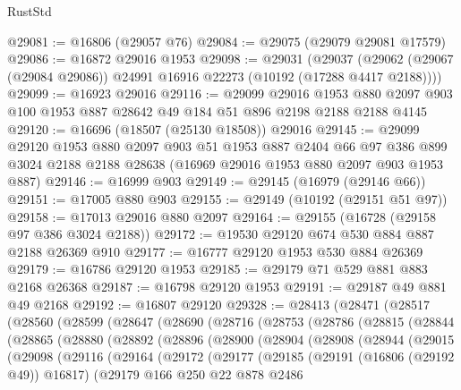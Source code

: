 \begin{lexlean}{RustStd}
\begin{coremodule}
@29081 := @16806 (@29057 @76)
@29084 := @29075 (@29079 @29081 @17579)
@29086 := @16872 @29016 @1953
@29098 := @29031
    (@29037 (@29062 (@29067 (@29084 @29086)) @24991 @16916 @22273 (@10192 (@17288 @4417 @2188))))
@29099 := @16923 @29016
@29116 := @29099
    @29016
    @1953
    @880
    @2097
    @903
    @100
    @1953
    @887
    @28642
    @49
    @184
    @51
    @896
    @2198
    @2188
    @2188
    @4145
@29120 := @16696 (@18507 (@25130 @18508)) @29016
@29145 := @29099
    @29120
    @1953
    @880
    @2097
    @903
    @51
    @1953
    @887
    @2404
    @66
    @97
    @386
    @899
    @3024
    @2188
    @2188
    @28638
    (@16969 @29016 @1953 @880 @2097 @903 @1953 @887)
@29146 := @16999 @903
@29149 := @29145 (@16979 (@29146 @66))
@29151 := @17005 @880 @903
@29155 := @29149 (@10192 (@29151 @51 @97))
@29158 := @17013 @29016 @880 @2097
@29164 := @29155 (@16728 (@29158 @97 @386 @3024 @2188))
@29172 := @19530 @29120 @674 @530 @884 @887 @2188 @26369 @910
@29177 := @16777 @29120 @1953 @530 @884 @26369
@29179 := @16786 @29120 @1953
@29185 := @29179 @71 @529 @881 @883 @2168 @26368
@29187 := @16798 @29120 @1953
@29191 := @29187 @49 @881 @49 @2168
@29192 := @16807 @29120
@29328 := @28413
    (@28471
      (@28517
        (@28560
          (@28599
            (@28647
              (@28690
                (@28716
                  (@28753
                    (@28786
                      (@28815
                        (@28844
                          (@28865
                            (@28880
                              (@28892
                                (@28896
                                  (@28900
                                    (@28904
                                      (@28908
                                        (@28944
                                          (@29015
                                            (@29098
                                              (@29116
                                                (@29164
                                                  (@29172
                                                    (@29177
                                                      (@29185
                                                        (@29191 (@16806 (@29192 @49)) @16817)
                                                        (@29179
                                                          @166
                                                          @250
                                                          @22
                                                          @878
                                                          @2486

\end{coremodule}
\end{lexlean}
